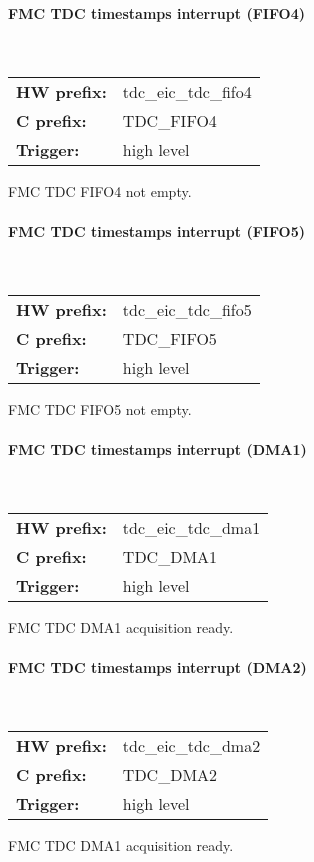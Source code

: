 \paragraph*{FMC TDC timestamps interrupt (FIFO4)}\mbox{}\\\vskip 6pt
\begin{small}
\begin{tabular}{l l }
{\bf HW prefix:}  & tdc\_eic\_tdc\_fifo4\\
{\bf C prefix:}  & TDC\_FIFO4\\
{\bf Trigger:}  & high level\\
\end{tabular}

\end{small}
\vspace{12pt}
FMC TDC FIFO4 not empty.
\paragraph*{FMC TDC timestamps interrupt (FIFO5)}\mbox{}\\\vskip 6pt
\begin{small}
\begin{tabular}{l l }
{\bf HW prefix:}  & tdc\_eic\_tdc\_fifo5\\
{\bf C prefix:}  & TDC\_FIFO5\\
{\bf Trigger:}  & high level\\
\end{tabular}

\end{small}
\vspace{12pt}
FMC TDC FIFO5 not empty.
\paragraph*{FMC TDC timestamps interrupt (DMA1)}\mbox{}\\\vskip 6pt
\begin{small}
\begin{tabular}{l l }
{\bf HW prefix:}  & tdc\_eic\_tdc\_dma1\\
{\bf C prefix:}  & TDC\_DMA1\\
{\bf Trigger:}  & high level\\
\end{tabular}

\end{small}
\vspace{12pt}
FMC TDC DMA1 acquisition ready.
\paragraph*{FMC TDC timestamps interrupt (DMA2)}\mbox{}\\\vskip 6pt
\begin{small}
\begin{tabular}{l l }
{\bf HW prefix:}  & tdc\_eic\_tdc\_dma2\\
{\bf C prefix:}  & TDC\_DMA2\\
{\bf Trigger:}  & high level\\
\end{tabular}

\end{small}
\vspace{12pt}
FMC TDC DMA1 acquisition ready.
